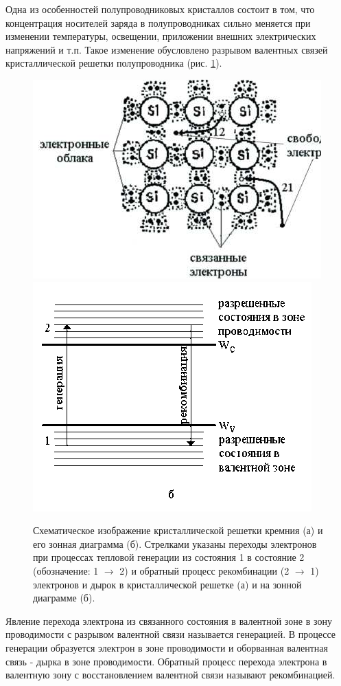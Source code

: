 Одна из особенностей полупроводниковых кристаллов состоит в том, что концентрация носителей заряда в полупроводниках
сильно меняется при изменении температуры, освещении, приложении внешних электрических напряжений и т.п. Такое изменение
обусловлено разрывом валентных связей кристаллической решетки полупроводника (рис. \ref{fig:figure1}).
\begin{figure}[H]
	\centering
	\includegraphics[]{img/1}
	\includegraphics[]{img/2}
	\caption{Схематическое изображение кристаллической решетки кремния (а) и его зонная диаграмма (б). Стрелками указаны переходы электронов при процессах тепловой генерации из состояния 1 в состояние 2 (обозначение: 1 $\to$ 2) и обратный процесс рекомбинации (2 $\to$ 1) электронов и дырок в кристаллической решетке (а) и на зонной диаграмме (б).}
	\label{fig:figure1}
\end{figure}

Явление перехода электрона из связанного состояния в валентной зоне в зону проводимости с разрывом валентной связи
называется генерацией. В процессе генерации образуется электрон в зоне проводимости и оборванная валентная связь - дырка
в зоне проводимости. Обратный процесс перехода электрона в валентную зону с восстановлением валентной связи называют
рекомбинацией.

